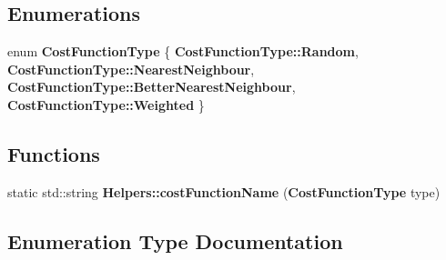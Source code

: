\subsection*{Enumerations}
\begin{DoxyCompactItemize}
\item 
enum {\bf Cost\+Function\+Type} \{ {\bf Cost\+Function\+Type\+::\+Random}, 
{\bf Cost\+Function\+Type\+::\+Nearest\+Neighbour}, 
{\bf Cost\+Function\+Type\+::\+Better\+Nearest\+Neighbour}, 
{\bf Cost\+Function\+Type\+::\+Weighted}
 \}
\end{DoxyCompactItemize}
\subsection*{Functions}
\begin{DoxyCompactItemize}
\item 
static std\+::string {\bf Helpers\+::cost\+Function\+Name} ({\bf Cost\+Function\+Type} type)
\end{DoxyCompactItemize}


\subsection{Enumeration Type Documentation}
